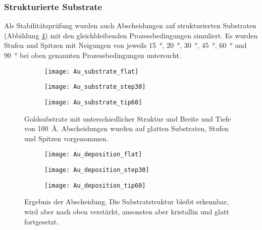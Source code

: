 \subsubsection{Strukturierte Substrate}

Als Stabilitätsprüfung wurden auch Abscheidungen auf strukturierten Substraten (Abbildung \ref{fig:goldsubstrate}) mit den gleichbleibenden Prozessbedingungen simuliert.
Es wurden Stufen und Spitzen mit Neigungen von jeweils \SI{15}{\degree}, \SI{20}{\degree}, \SI{30}{\degree}, \SI{45}{\degree}, \SI{60}{\degree} und \SI{90}{\degree} bei oben genannten Prozessbedingungen untersucht.

\begin{figure}[bt]
  \captionsetup[subfigure]{singlelinecheck=false}
  \def\subfigwidth{0.31\textwidth}
  \begin{subfigure}[t]{\subfigwidth}
    \texttt{[image: Au\_substrate\_flat]}
    \label{fig:goldsubstrate-a}
  \end{subfigure}
  \hfill
  \begin{subfigure}[t]{\subfigwidth}
    \texttt{[image: Au\_substrate\_step30]}
    \label{fig:goldsubstrate-b}
  \end{subfigure}
  \hfill
  \begin{subfigure}[t]{\subfigwidth}
    \texttt{[image: Au\_substrate\_tip60]}
    \label{fig:goldsubstrate-c}
  \end{subfigure}
  \caption[Strukturierte Goldsubstrate]{Goldsubstrate mit unterschiedlicher Struktur und Breite und Tiefe von \SI{100}{\angstrom}.
    Abscheidungen wurden auf glatten Substraten, Stufen und Spitzen vorgenommen.}
  \label{fig:goldsubstrate}
\end{figure}

\begin{figure}[bt]
  \captionsetup[subfigure]{singlelinecheck=false}
  \def\subfigwidth{0.31\textwidth}
  \begin{subfigure}[t]{\subfigwidth}
    \texttt{[image: Au\_deposition\_flat]}
    \label{fig:golddepositions-a}
  \end{subfigure}
  \hfill
  \begin{subfigure}[t]{\subfigwidth}
    \texttt{[image: Au\_deposition\_step30]}
    \label{fig:golddepositions-b}
  \end{subfigure}
  \hfill
  \begin{subfigure}[t]{\subfigwidth}
    \texttt{[image: Au\_deposition\_tip60]}
    \label{fig:golddepositions-c}
  \end{subfigure}
  \caption[Abscheidung auf strukturierten Substraten]{
    Ergebnis der Abscheidung.
    Die Substratstruktur bleibt erkennbar, wird aber nach oben verstärkt, ansonsten aber kristallin und glatt fortgesetzt.
  }
  \label{fig:golddepositions}
\end{figure}

